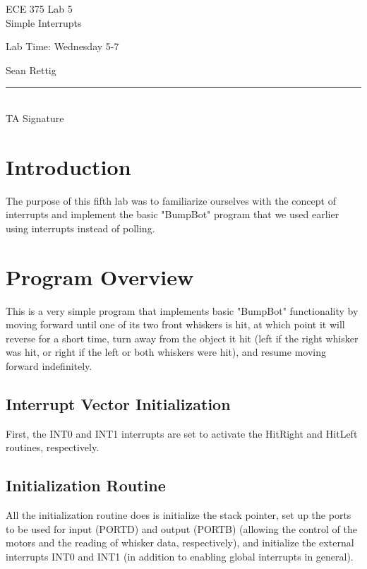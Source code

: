 \documentclass[12pt,letterpaper]{article}
\begin{document}
\begin{titlepage}
    \vspace*{4cm}
    \begin{flushright}
    {\huge
        ECE 375 Lab 5\\[1cm]
    }
    {\large
        Simple Interrupts
    }
    \end{flushright}
    \begin{flushleft}
    Lab Time: Wednesday 5-7
    \end{flushleft}
    \begin{flushright}
    Sean Rettig
    \vfill
    \rule{5in}{.5mm}\\
    TA Signature
    \end{flushright}

\end{titlepage}

\section{Introduction}

The purpose of this fifth lab was to familiarize ourselves with the concept of
interrupts and implement the basic "BumpBot" program that we used earlier using
interrupts instead of polling.

\section{Program Overview}

This is a very simple program that implements basic "BumpBot" functionality by
moving forward until one of its two front whiskers is hit, at which point it
will reverse for a short time, turn away from the object it hit (left if the
right whisker was hit, or right if the left or both whiskers were hit), and
resume moving forward indefinitely.

\subsection{Interrupt Vector Initialization}

First, the INT0 and INT1 interrupts are set to activate the HitRight and
HitLeft routines, respectively.

\subsection{Initialization Routine}

All the initialization routine does is initialize the stack pointer, set up the
ports to be used for input (PORTD) and output (PORTB) (allowing the control of
the motors and the reading of whisker data, respectively), and initialize the
external interrupts INT0 and INT1 (in addition to enabling global interrupts in
general).
\end{document}

